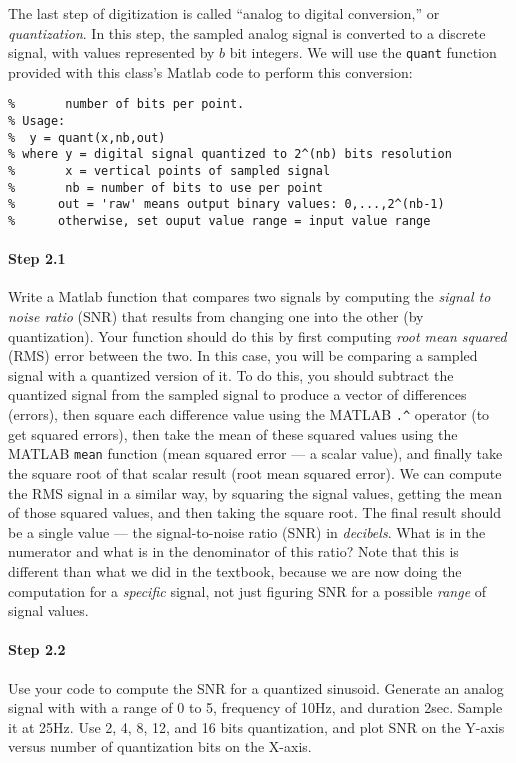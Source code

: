 The last step of digitization is called ``analog to digital
conversion,'' or \emph{quantization}. In this step, the sampled analog
signal is converted to a discrete signal, with values represented by
$b$ bit integers. We will use the \texttt{quant} function provided
with this class's Matlab code to perform this conversion:
\begin{lstlisting}[style=Matlab-editor,basicstyle=\mlttfamily\small]
% QUANT Quantize a sampled (discrete) signal using a prescribed
%       number of bits per point.
% Usage:
%  y = quant(x,nb,out)
% where y = digital signal quantized to 2^(nb) bits resolution
%       x = vertical points of sampled signal
%       nb = number of bits to use per point
%      out = 'raw' means output binary values: 0,...,2^(nb-1)
%      otherwise, set ouput value range = input value range
\end{lstlisting}

\paragraph{Step 2.1} Write a Matlab function that compares two signals
by computing the \emph{signal to noise ratio} (SNR) that results from
changing one into the other (by quantization). Your function should do
this by first computing \emph{root mean squared} (RMS) error between
the two. In this case, you will be comparing a sampled signal with a
quantized version of it.  To do this, you should subtract the
quantized signal from the sampled signal to produce a vector of
differences (errors), then square each difference value using the
MATLAB \verb|.^| operator (to get squared errors), then take the mean
of these squared values using the MATLAB \verb|mean| function (mean
squared error --- a scalar value), and finally take the square root of
that scalar result (root mean squared error). We can compute the RMS
signal in a similar way, by squaring the signal values, getting the
mean of those squared values, and then taking the square root. The
final result should be a single value --- the signal-to-noise ratio
(SNR) in \emph{decibels}. What is in the numerator and what is in the
denominator of this ratio? Note that this is different than what we
did in the textbook, because we are now doing the computation for a
\emph{specific} signal, not just figuring SNR for a possible
\emph{range} of signal values.



  \paragraph{Step 2.2} Use your code to compute the SNR for a
  quantized sinusoid. Generate an analog signal with with a range of 0
  to 5, frequency of 10Hz, and duration 2sec. Sample it at 25Hz. Use
  2, 4, 8, 12, and 16 bits quantization, and plot SNR on the Y-axis
  versus number of quantization bits on the X-axis.


